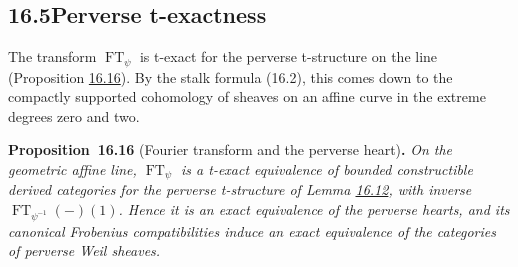 \documentclass[11pt]{article}
\newenvironment{bpstatement}[2]{\par\addvspace{0.6\baselineskip}\noindent\textbf{#1}#2\textbf{.}\enspace\ignorespaces}
  {\par\addvspace{0.4\baselineskip}}
\newenvironment{bpstatementit}[2]{\begin{bpstatement}{#1}{#2}\itshape\ignorespaces}{\end{bpstatement}}
\begin{document}
\subsection*{\texorpdfstring{16.5\quad Perverse t-exactness}{16.5 Perverse t-exactness}}
\label{bp46}%
\label{bp47}%
The transform \(\operatorname{FT}_\psi\) is t-exact for the perverse t-structure on the line (Proposition \hyperref[bp48]{16.16}). By the stalk formula (16.2), this comes down to the compactly supported cohomology of sheaves on an affine curve in the extreme degrees zero and two.

\label{bp48}%
\begin{bpstatementit}{Proposition~16.16}{ (Fourier transform and the perverse heart)}
On the geometric affine line, \(\operatorname{FT}_\psi\) is a t-exact equivalence of bounded constructible derived categories for the perverse t-structure of Lemma \hyperref[bp37]{16.12}, with inverse \(\operatorname{FT}_{\psi^{-1}}(-)(1)\). Hence it is an exact equivalence of the perverse hearts, and its canonical Frobenius compatibilities induce an exact equivalence of the categories of perverse Weil sheaves.
\end{bpstatementit}
\end{document}

